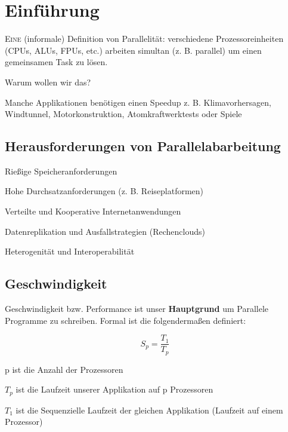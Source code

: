 \section{Einführung}
\noindent\lettrine[nindent=0em,lines=3]{E}{ine} (informale) Definition von Parallelität: verschiedene Prozessoreinheiten 
(CPUs, ALUs, FPUs, etc.) arbeiten simultan (z. B. parallel) um einen gemeinsamen
Task zu lösen.

Warum wollen wir das?
\begin{compactitem}
\item Manche Applikationen benötigen einen Speedup z. B. Klimavorhersagen,
        Windtunnel, Motorkonstruktion, Atomkraftwerktests oder Spiele
\end{compactitem}

\subsection{Herausforderungen von Parallelabarbeitung}
\begin{compactitem}
\item Rießige Speicheranforderungen
\item Hohe Durchsatzanforderungen (z. B. Reiseplatformen)
\item Verteilte und Kooperative Internetanwendungen
\item Datenreplikation und Ausfallstrategien (Rechenclouds)
\item Heterogenität und Interoperabilität
\end{compactitem}

\subsection{Geschwindigkeit}
Geschwindigkeit bzw. Performance ist unser \textbf{Hauptgrund} um Parallele
Programme zu schreiben. Formal ist die  folgendermaßen definiert:

\[
S_p = \frac{T_1}{T_p}
\]

\begin{compactitem}
    \item p ist die Anzahl der Prozessoren
    \item \(T_p\) ist die Laufzeit unserer Applikation auf p Prozessoren
    \item \(T_1\) ist die Sequenzielle Laufzeit der gleichen Applikation (Laufzeit auf einem Prozessor)
\end{compactitem}

